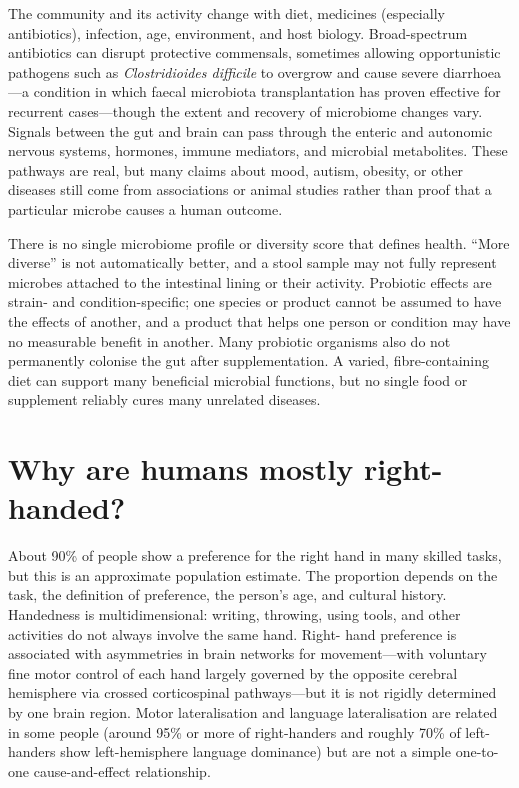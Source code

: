 \documentclass[11pt,oneside]{report}
\begin{document}
The community and its activity change with diet, medicines (especially
antibiotics), infection, age, environment, and host biology. Broad-spectrum
antibiotics can disrupt protective commensals, sometimes allowing opportunistic
pathogens such as \emph{Clostridioides difficile} to overgrow and cause severe
diarrhoea—a condition in which faecal microbiota transplantation has proven
effective for recurrent cases—though the extent and recovery of microbiome
changes vary. Signals between the gut and brain can pass through
the enteric and autonomic nervous systems, hormones, immune mediators, and
microbial metabolites. These pathways are real, but many claims about mood,
autism, obesity, or other diseases still come from associations or animal
studies rather than proof that a particular microbe causes a human outcome.

There is no single microbiome profile or diversity score that defines health.
``More diverse'' is not automatically better, and a stool sample may not fully
represent microbes attached to the intestinal lining or their activity. Probiotic
effects are strain- and condition-specific; one species or product cannot be
assumed to have the effects of another, and a product that helps one person or
condition may have no measurable benefit in another. Many probiotic organisms
also do not permanently colonise the gut after supplementation. A varied,
fibre-containing diet can support many beneficial microbial functions, but no
single food or supplement reliably cures many unrelated diseases.

\section{Why are humans mostly right-handed?}

About 90\% of people show a preference for the right hand in many skilled tasks,
but this is an approximate population estimate. The proportion depends on the
task, the definition of preference, the person's age, and cultural history.
Handedness is multidimensional: writing, throwing,
using tools, and other activities do not always involve the same hand. Right-
hand preference is associated with asymmetries in brain networks for
movement—with voluntary fine motor control of each hand largely governed by the
opposite cerebral hemisphere via crossed corticospinal pathways—but it is not
rigidly determined by one brain region. Motor lateralisation and language
lateralisation are related in some people (around 95\% or more of right-handers
and roughly 70\% of left-handers show left-hemisphere language dominance) but
are not a simple one-to-one cause-and-effect relationship.
\end{document}
